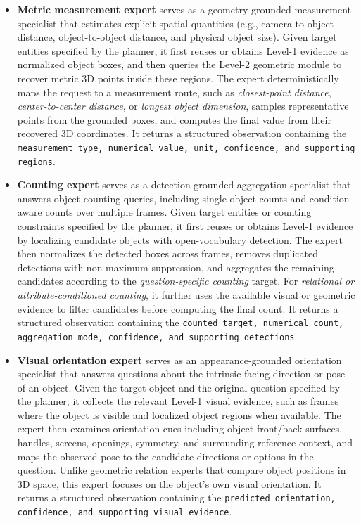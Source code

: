 \begin{itemize}
\item  \textbf{Metric measurement expert} serves as a geometry-grounded measurement specialist that estimates explicit spatial quantities (e.g., camera-to-object distance, object-to-object distance, and physical object size). 
% 
Given target entities specified by the planner, it first reuses or obtains Level-1 evidence as normalized object boxes, and then queries the Level-2 geometric module to recover metric 3D points inside these regions.
The expert deterministically maps the request to a measurement route, such as \textit{closest-point distance}, \textit{center-to-center distance}, or \textit{longest object dimension}, samples representative points from the grounded boxes, and computes the final value from their recovered 3D coordinates.
It returns a structured observation containing the \texttt{measurement type, numerical value, unit, confidence, and supporting regions}.

\item \textbf{Counting expert} serves as a detection-grounded aggregation specialist that answers object-counting queries, including single-object counts and condition-aware counts over multiple frames.
%
Given target entities or counting constraints specified by the planner, it first reuses or obtains Level-1 evidence by localizing candidate objects with open-vocabulary detection.
The expert then normalizes the detected boxes across frames, removes duplicated detections with non-maximum suppression, and aggregates the remaining candidates according to the \textit{question-specific counting} target.
% 
For \textit{relational or attribute-conditioned counting}, it further uses the available visual or geometric evidence to filter candidates before computing the final count.
It returns a structured observation containing the \texttt{counted target, numerical count, aggregation mode, confidence, and supporting detections}.

\item \textbf{Visual orientation expert} serves as an appearance-grounded orientation specialist that answers questions about the intrinsic facing direction or pose of an object.
%
Given the target object and the original question specified by the planner, it collects the relevant Level-1 visual evidence, such as frames where the object is visible and localized object regions when available.
The expert then examines orientation cues including object front/back surfaces, handles, screens, openings, symmetry, and surrounding reference context, and maps the observed pose to the candidate directions or options in the question.
Unlike geometric relation experts that compare object positions in 3D space, this expert focuses on the object's own visual orientation.
It returns a structured observation containing the \texttt{predicted orientation, confidence, and supporting visual evidence}.


\end{itemize}
